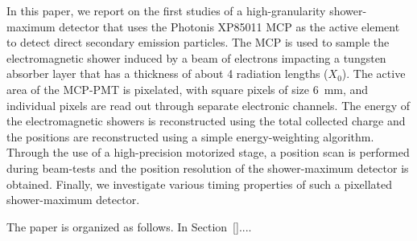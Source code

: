 \documentclass[12pt]{article}
\begin{document}
{In this paper, we report on the first studies of a high-granularity
shower-maximum detector that uses the Photonis XP85011 MCP as the active
element to detect direct secondary emission particles. The MCP is used to
sample the electromagnetic shower induced by a beam of electrons impacting a
tungsten absorber layer that has a thickness of about 4 radiation lengths
($X_{0}$). The active area of the MCP-PMT is pixelated, with square pixels of
size $6$~mm, and individual pixels are read out through separate electronic
channels. The energy of the electromagnetic showers is reconstructed using the
total collected charge and the positions are reconstructed using a simple
energy-weighting algorithm. Through the use of a high-precision motorized stage,
a position scan is performed during beam-tests and the position resolution of
the shower-maximum detector is obtained. Finally, we investigate various timing
properties of such a pixellated shower-maximum detector.

The paper is organized as follows. In Section~\ref{}....
}
\end{document}
